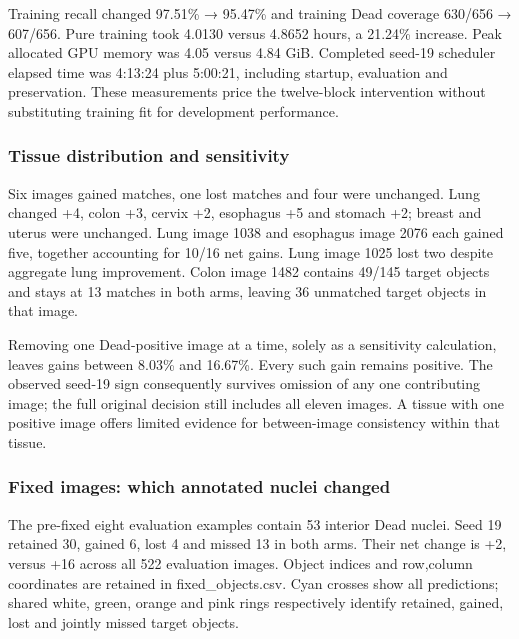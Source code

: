 \documentclass[
  11pt,
]{article}
\begin{document}
Training recall changed 97.51\% → 95.47\% and training Dead coverage
630/656 → 607/656. Pure training took 4.0130 versus 4.8652 hours, a
21.24\% increase. Peak allocated GPU memory was 4.05 versus 4.84 GiB.
Completed seed-19 scheduler elapsed time was 4:13:24 plus 5:00:21,
including startup, evaluation and preservation. These measurements price
the twelve-block intervention without substituting training fit for
development performance.

\subsubsection{Tissue distribution and
sensitivity}\label{tissue-distribution-and-sensitivity}

Six images gained matches, one lost matches and four were unchanged.
Lung changed +4, colon +3, cervix +2, esophagus +5 and stomach +2;
breast and uterus were unchanged. Lung image 1038 and esophagus image
2076 each gained five, together accounting for 10/16 net gains. Lung
image 1025 lost two despite aggregate lung improvement. Colon image 1482
contains 49/145 target objects and stays at 13 matches in both arms,
leaving 36 unmatched target objects in that image.

Removing one Dead-positive image at a time, solely as a sensitivity
calculation, leaves gains between 8.03\% and 16.67\%. Every such gain
remains positive. The observed seed-19 sign consequently survives
omission of any one contributing image; the full original decision still
includes all eleven images. A tissue with one positive image offers
limited evidence for between-image consistency within that tissue.

\subsubsection{Fixed images: which annotated nuclei
changed}\label{fixed-images-which-annotated-nuclei-changed}

The pre-fixed eight evaluation examples contain 53 interior Dead nuclei.
Seed 19 retained 30, gained 6, lost 4 and missed 13 in both arms. Their
net change is +2, versus +16 across all 522 evaluation images. Object
indices and row,column coordinates are retained in fixed\_objects.csv.
Cyan crosses show all predictions; shared white, green, orange and pink
rings respectively identify retained, gained, lost and jointly missed
target objects.

\noindent
\end{document}
